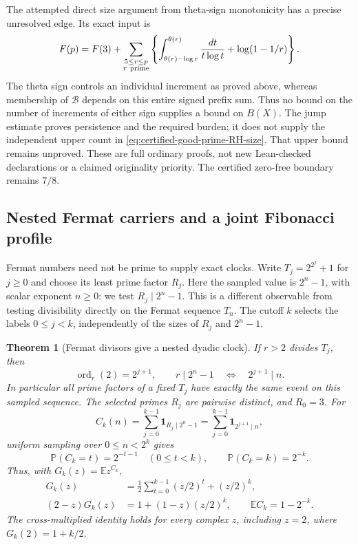 \documentclass[11pt]{article}
\newtheorem{theorem}{Theorem}[section]
\theoremstyle{definition}
\begin{document}
The attempted direct size argument from theta-sign monotonicity
has a precise unresolved edge. Its exact input is
\[
 F(p)=F(3)+
 \sum_{\substack{5\le r\le p\\r\ {\rm prime}}}
 \left\{\int_{\theta(r)-\log r}^{\theta(r)}
                \frac{dt}{t\log t}+\log(1-1/r)\right\}.
\]
The theta sign controls an individual increment as proved above,
whereas membership of $\mathcal B$ depends on this entire signed
prefix sum. Thus no bound on the number of increments of either
sign supplies a bound on $B(X)$. The jump estimate proves
persistence and the required burden; it does not supply the
independent upper count in
\eqref{eq:certified-good-prime-RH-size}.
That upper bound remains unproved. These are full ordinary proofs,
not new Lean-checked declarations or a claimed originality priority.
The certified zero-free boundary remains $7/8$.

\subsection{Nested Fermat carriers and a joint Fibonacci profile}
\label{sec:fermat-fibonacci-joint}

Fermat numbers need not be prime to supply exact clocks. Write
$T_j=2^{2^j}+1$ for $j\ge0$ and choose its least prime factor $R_j$.
Here the sampled value is $2^n-1$, with scalar exponent $n\ge0$:
we test $R_j\mid2^n-1$. This is a different observable from
testing divisibility directly on the Fermat sequence $T_n$.
The cutoff $k$ selects the labels $0\le j<k$, independently of
the sizes of $R_j$ and $2^n-1$.

\begin{theorem}[Fermat divisors give a nested dyadic clock]
\label{thm:fermat-dyadic-clock}
If $r>2$ divides $T_j$, then
\[
 \operatorname{ord}_{r}(2)=2^{j+1},\qquad
 r\mid2^n-1\quad\Longleftrightarrow\quad2^{j+1}\mid n.
\]
In particular all prime factors of a fixed $T_j$ have exactly the
same event on this sampled sequence. The selected primes $R_j$
are pairwise distinct, and $R_0=3$.
For
\[
 C_k(n)=\sum_{j=0}^{k-1}\boldsymbol{1}_{R_j\mid2^n-1}
       =\sum_{j=0}^{k-1}\boldsymbol{1}_{2^{j+1}\mid n},
\]
uniform sampling over $0\le n<2^k$ gives
\[
 \mathbb P(C_k=t)=2^{-t-1}\quad(0\le t<k),\qquad
 \mathbb P(C_k=k)=2^{-k}.
\]
Thus, with $G_k(z)=\mathbb E z^{C_k}$,
\begin{align}
 G_k(z)&=\frac12\sum_{t=0}^{k-1}(z/2)^t+(z/2)^k,
 \label{eq:fermat-geometric-pgf}\\
 (2-z)G_k(z)&=1+(1-z)(z/2)^k,\qquad
 \mathbb E C_k=1-2^{-k}.
 \label{eq:fermat-geometric-compensation}
\end{align}
The cross-multiplied identity holds for every complex $z$,
including $z=2$, where $G_k(2)=1+k/2$.
\end{theorem}
\end{document}
